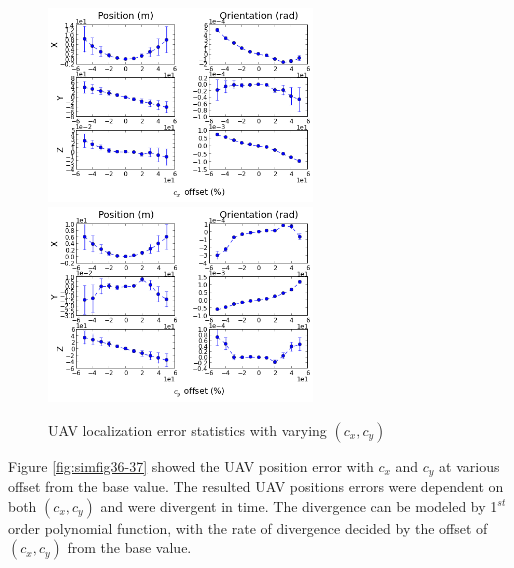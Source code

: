 \begin{figure}[h]
  \centering
  \includegraphics[width=7cm, keepaspectratio=true]{./Figures/SimulationFigures/Figure34.png}
  \includegraphics[width=7cm, keepaspectratio=true]{./Figures/SimulationFigures/Figure35.png}
  \caption{UAV localization error statistics with varying $(c_x, c_y)$}
  \label{fig:simfig34-35}
\end{figure}

Figure \ref{fig:simfig36-37} showed the UAV position error with $c_x$
and $c_y$ at various offset from the base value. The resulted UAV
positions errors were dependent on both $(c_{x}, c_{y})$ and were
divergent in time. The divergence can be modeled by 1$^{st}$ order
polynomial function, with the rate of divergence decided by the offset
of $(c_{x}, c_{y})$ from the base value.

